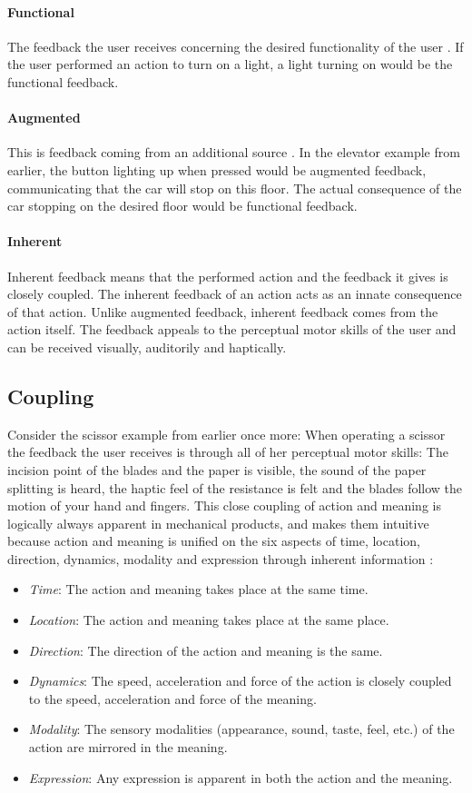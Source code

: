 \paragraph{Functional} The feedback the user receives concerning the desired functionality of the user \cite{frogger}. If the user performed an action to turn on a light, a light turning on would be the functional feedback.
\paragraph{Augmented} This is feedback coming from an additional source \cite{frogger}. In the elevator example from earlier, the button lighting up when pressed would be augmented feedback, communicating that the car will stop on this floor. The actual consequence of the car stopping on the desired floor would be functional feedback.
\paragraph{Inherent} Inherent feedback means that the performed action and the feedback it gives is closely coupled. The inherent feedback of an action acts as an innate consequence of that action. Unlike augmented feedback, inherent feedback comes from the action itself. The feedback appeals to the perceptual motor skills of the user and can be received visually, auditorily and haptically.

\subsection{Coupling}
Consider the scissor example from earlier once more: When operating a scissor the feedback the user receives is through all of her perceptual motor skills: The incision point of the blades and the paper is visible, the sound of the paper splitting is heard, the haptic feel of the resistance is felt and the blades follow the motion of your hand and fingers. This close coupling of action and meaning is logically always apparent in mechanical products, and makes them intuitive because action and meaning is unified on the six aspects of time, location, direction, dynamics, modality and expression through inherent information \cite{frogger} \cite{transbehav}:
\begin{itemize}
  \item \textit{Time}: The action and meaning takes place at the same time.
  \item \textit{Location}: The action and meaning takes place at the same place.
  \item \textit{Direction}: The direction of the action and meaning is the same.
  \item \textit{Dynamics}: The speed, acceleration and force of the action is closely coupled to the speed, acceleration and force of the meaning.
  \item \textit{Modality}: The sensory modalities (appearance, sound, taste, feel, etc.) of the action are mirrored in the meaning.
  \item \textit{Expression}: Any expression is apparent in both the action and the meaning.
\end{itemize}

